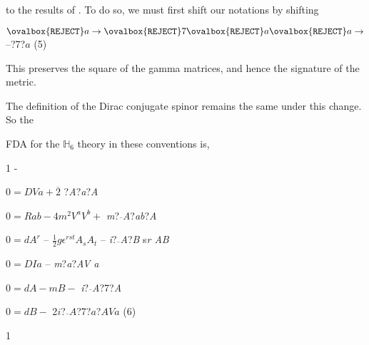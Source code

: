 \documentclass[a4paper,12pt]{article}
\begin{document}
to the results of . To do so, we must first shift our notations by shifting
\begin{center}
$\ovalbox{\tt\small REJECT} a\rightarrow\ovalbox{\tt\small REJECT} 7\ovalbox{\tt\small REJECT} a \ovalbox{\tt\small REJECT} a\rightarrow$ --?7?$a$   (5)
\end{center}
This preserves the square of the gamma matrices, and hence the signature of the metric.

The definition of the Dirac conjugate spinor remains the same under this change. So the

FDA for the $\mathbb{H}_{6}$ theory in these conventions is,
\begin{center}
1 -
\end{center}
$0 = DVa + \overline{2}$ ?{\it A}?{\it a}?{\it A}

$0 =Rab - 4m^{2}V^{a}V^{b} +$ {\it m}?$\overline{}${\it A}?{\it ab}?{\it A}

$0 = dA^{r}$ -- $\displaystyle \frac{1}{2}g\epsilon^{rst}A_{s}A_{t}$ -- {\it i}?$\overline{}${\it A}?{\it B} s{\it r AB}

$0 =DI a$ -- {\it m}?{\it a}?{\it AV a}

$0=dA-mB -$ {\it i}?$\overline{}${\it A}?7?{\it A}
\begin{center}
$0=dB -$ 2$i$?$\overline {}A$?7?$a$?$AVa$   (6)
\end{center}
1
\end{document}

